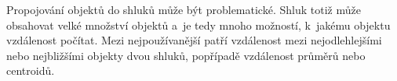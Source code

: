 \begin{description}
Propojování objektů do shluků může být problematické. Shluk totiž může obsahovat velké množství objektů a~je tedy mnoho možností, k~jakému objektu vzdálenost počítat. Mezi nejpoužívanější patří  vzdálenost mezi nejodlehlejšími nebo nejbližšími objekty dvou shluků, popřípadě vzdálenost průměrů nebo centroidů. %



\end{description}
